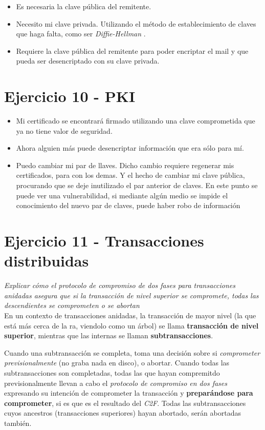 \begin{itemize}
    \item Es necesaria la clave pública del remitente.
    \item Necesito mi clave privada. Utilizando el método de establecimiento de claves que haga falta, como ser \emph{Diffie-Hellman} \autocite{WikipediaEmailEncryption}.
    \item Requiere la clave pública del remitente para poder encriptar el mail y que pueda ser desencriptado con su clave privada.
\end{itemize}


\section{Ejercicio 10 - PKI}

\begin{itemize}
    \item Mi certificado se encontrará firmado utilizando una clave comprometida que ya no tiene valor de seguridad.
    \item Ahora alguien más puede desencriptar información que era sólo para mí.
    \item Puedo cambiar mi par de llaves. Dicho cambio requiere regenerar mis certificados, para con los demas. Y el hecho de cambiar mi clave pública, procurando que se deje inutilizado el par anterior de claves. En este punto se puede ver una vulnerabilidad, si mediante algún medio se impide el conocimiento del nuevo par de claves, puede haber robo de información \autocite{WikipediaPublicKeyCertificate}
\end{itemize}

\section{Ejercicio 11 - Transacciones distribuidas}

\emph{Explicar cómo el protocolo de compromiso de dos fases para transacciones anidadas asegura que si la transacción de nivel superior se compromete, todas las descendientes se comprometen o se abortan} 
~\\

En un contexto de transacciones anidadas, la transacción de mayor nivel (la que está más cerca de la ra, viendolo como un árbol) se llama \textbf{transacción de nivel superior}, mientras que las internas se llaman \textbf{subtransacciones}.  

Cuando una subtransacción se completa, toma una decisión sobre si \emph{comprometer previsionalmente} (no graba nada en disco), o abortar. Cuando todas las subtransacciones son completadas, todas las que hayan compremitdo previsionalmente llevan a cabo el \emph{protocolo de compromiso en dos fases} expresando su intención de comprometer la transacción y \textbf{preparándose para comprometer}, si es que es el resultado del \emph{C2F}. Todas las subtransacciones cuyos ancestros (transacciones superiores) hayan abortado, serán abortadas también.  

